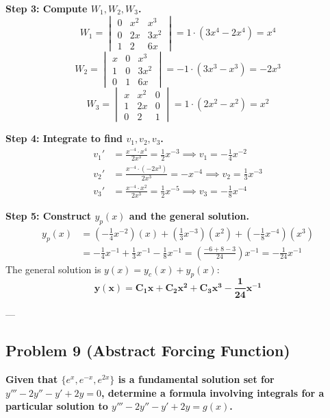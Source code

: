 \documentclass[12pt]{article}
\begin{document}
\textbf{Step 3: Compute $W_1, W_2, W_3$.}
\[ W_1 = \begin{vmatrix} 0 & x^2 & x^3 \\ 0 & 2x & 3x^2 \\ 1 & 2 & 6x \end{vmatrix} = 1 \cdot (3x^4 - 2x^4) = x^4 \]
\[ W_2 = \begin{vmatrix} x & 0 & x^3 \\ 1 & 0 & 3x^2 \\ 0 & 1 & 6x \end{vmatrix} = -1 \cdot (3x^3 - x^3) = -2x^3 \]
\[ W_3 = \begin{vmatrix} x & x^2 & 0 \\ 1 & 2x & 0 \\ 0 & 2 & 1 \end{vmatrix} = 1 \cdot (2x^2 - x^2) = x^2 \]

\textbf{Step 4: Integrate to find $v_1, v_2, v_3$.}
\begin{align*}
v_1' &= \frac{x^{-4} \cdot x^4}{2x^3} = \frac{1}{2}x^{-3} \implies v_1 = -\frac{1}{4}x^{-2} \\
v_2' &= \frac{x^{-4} \cdot (-2x^3)}{2x^3} = -x^{-4} \implies v_2 = \frac{1}{3}x^{-3} \\
v_3' &= \frac{x^{-4} \cdot x^2}{2x^3} = \frac{1}{2}x^{-5} \implies v_3 = -\frac{1}{8}x^{-4}
\end{align*}

\textbf{Step 5: Construct $y_p(x)$ and the general solution.}
\begin{align*}
y_p(x) &= \left(-\frac{1}{4}x^{-2}\right)(x) + \left(\frac{1}{3}x^{-3}\right)(x^2) + \left(-\frac{1}{8}x^{-4}\right)(x^3) \\
&= -\frac{1}{4}x^{-1} + \frac{1}{3}x^{-1} - \frac{1}{8}x^{-1} = \left(\frac{-6 + 8 - 3}{24}\right)x^{-1} = -\frac{1}{24}x^{-1}
\end{align*}
The general solution is $y(x) = y_c(x) + y_p(x)$:
\[ \mathbf{y(x) = C_1 x + C_2 x^2 + C_3 x^3 - \frac{1}{24}x^{-1}} \]

---

\subsection{Problem 9 (Abstract Forcing Function)}
\textbf{Given that $\{e^x, e^{-x}, e^{2x}\}$ is a fundamental solution set for $y''' - 2y'' - y' + 2y = 0$, determine a formula involving integrals for a particular solution to $y''' - 2y'' - y' + 2y = g(x)$.}
\end{document}
